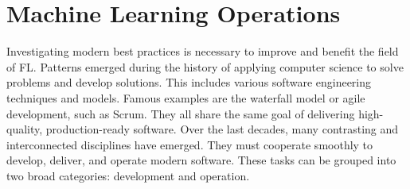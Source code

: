 
\section{Machine Learning Operations}

Investigating modern best practices is necessary to improve and benefit the field of FL.
Patterns emerged during the history of applying computer science to solve problems and develop solutions.
This includes various software engineering techniques and models.
Famous examples are the waterfall model or agile development, such as Scrum.
They all share the same goal of delivering high-quality, production-ready software.
Over the last decades, many contrasting and interconnected disciplines have emerged.
They must cooperate smoothly to develop, deliver, and operate modern software.
These tasks can be grouped into two broad categories: development and operation.




